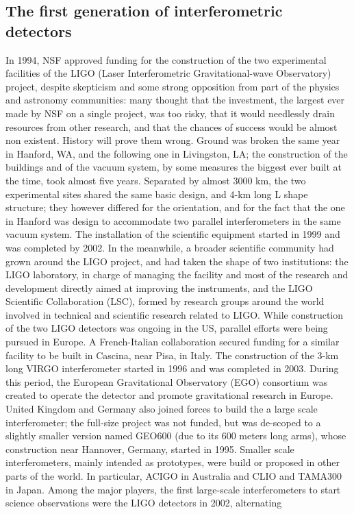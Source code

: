 \newpage
\subsection{The first generation of interferometric detectors}\label{subsec:history}

In 1994, NSF approved funding for the construction of the two experimental facilities of the LIGO (Laser Interferometric Gravitational-wave Observatory) project, despite skepticism and some strong opposition from part of the physics and astronomy communities: many thought that the investment, the largest ever made by NSF on a single project, was too risky, that it would needlessly drain resources from other research, and that the chances of success would be almost non existent. History will prove them wrong.
Ground was broken the same year in Hanford, WA, and the following one in Livingston, LA; the construction of the buildings and of the vacuum system, by some measures the biggest ever built at the time, took almost five years. Separated by almost 3000 km, the two experimental sites shared the same basic design, and 4-km long L shape structure; they however differed for the orientation, and for the fact that the one in Hanford was design to accommodate two parallel interferometers in the same vacuum system. The installation of the scientific equipment started in 1999 and was completed by 2002. In the meanwhile, a broader scientific community had grown around the LIGO project, and had taken the shape of two institutions: the LIGO laboratory, in charge of managing the facility and most of the research and development directly aimed at improving the instruments, and the LIGO Scientific Collaboration (LSC), formed by research groups around the world involved in technical and scientific research related to LIGO.
While construction of the two LIGO detectors was ongoing in the US, parallel efforts were being pursued in Europe. A French-Italian collaboration secured funding for a similar facility to be built in Cascina, near Pisa, in Italy. The construction of the 3-km long VIRGO interferometer started in 1996 and was completed in 2003. During this period, the European Gravitational Observatory (EGO) consortium was created to operate the detector and promote gravitational research in Europe. United Kingdom and Germany also joined forces to build the a large scale interferometer; the full-size project was not funded, but was de-scoped to a slightly smaller version named GEO600 (due to its 600 meters long arms), whose construction near Hannover, Germany, started in 1995.
Smaller scale interferometers, mainly intended as prototypes, were build or proposed in other parts of the world. In particular, ACIGO in Australia and CLIO and TAMA300 in Japan.
Among the major players, the first large-scale interferometers to start science observations were the LIGO detectors in 2002, alternating 

